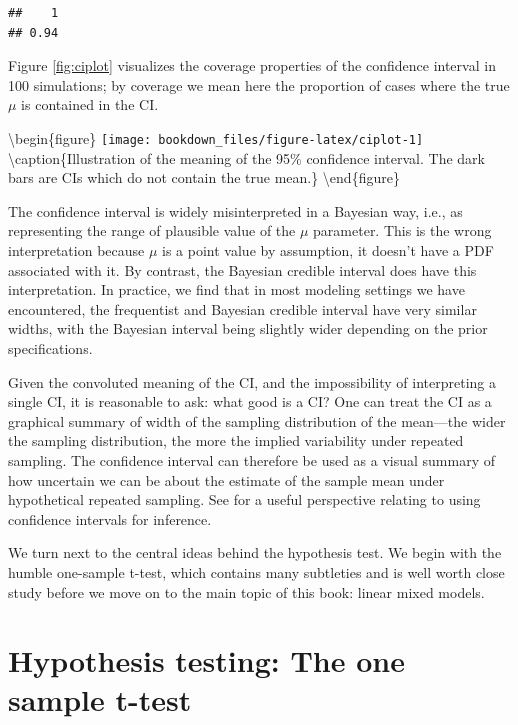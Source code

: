 \documentclass[12pt,]{krantz}
\begin{document}
\begin{verbatim}
##    1 
## 0.94
\end{verbatim}

Figure \ref{fig:ciplot} visualizes the coverage properties of the confidence interval in 100 simulations; by coverage we mean here the proportion of cases where the true \(\mu\) is contained in the CI.

\textbackslash{}begin\{figure\}
\texttt{[image: bookdown\_files/figure-latex/ciplot-1]} \textbackslash{}caption\{Illustration of the meaning of the 95\% confidence interval. The dark bars are CIs which do not contain the true mean.\}\label{fig:ciplot}
\textbackslash{}end\{figure\}

The confidence interval is widely misinterpreted in a Bayesian way, i.e., as representing the range of plausible value of the \(\mu\) parameter. This is the wrong interpretation because \(\mu\) is a point value by assumption, it doesn't have a PDF associated with it. By contrast, the Bayesian credible interval does have this interpretation.
In practice, we find that in most modeling settings we have encountered, the frequentist and Bayesian credible interval have very similar widths, with the Bayesian interval being slightly wider depending on the prior specifications.

Given the convoluted meaning of the CI, and the impossibility of interpreting a single CI, it is reasonable to ask: what good is a CI? One can treat the CI as a graphical summary of width of the sampling distribution of the mean---the wider the sampling distribution, the more the implied variability under repeated sampling. The confidence interval can therefore be used as a visual summary of how uncertain we can be about the estimate of the sample mean under hypothetical repeated sampling. See \citet{cumming2014new} for a useful perspective relating to using confidence intervals for inference.

We turn next to the central ideas behind the hypothesis test. We begin with the humble one-sample t-test, which contains many subtleties and is well worth close study before we move on to the main topic of this book: linear mixed models.

\hypertarget{hypothesis-testing-the-one-sample-t-test}{%
\section{Hypothesis testing: The one sample t-test}\label{hypothesis-testing-the-one-sample-t-test}}
\end{document}
